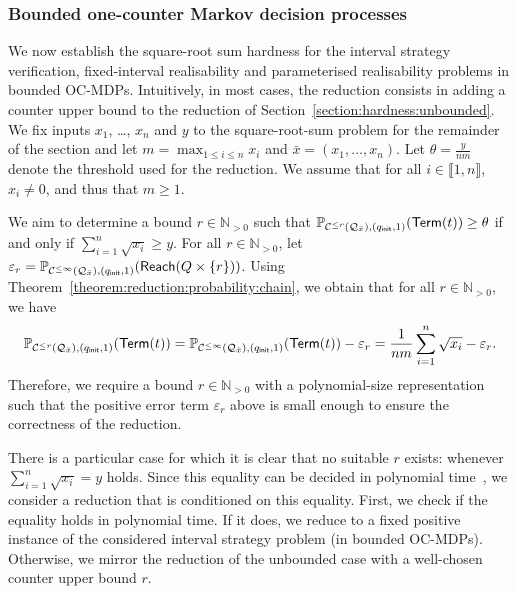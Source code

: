 \documentclass[a4paper,UKenglish,cleveref,autoref,thm-restate,colorlinks]{lipics-v2021}
\newcommand{\init}{\mathsf{init}}
\newcommand{\integerInterval}[1]{\llbracket{}#1\rrbracket{}}
\newcommand{\sqsx}{x} \newcommand{\sqsxVect}{\bar{x}} \newcommand{\sqsm}{m} \newcommand{\sqsy}{y} \newcommand{\sqsi}{i} \newcommand{\sqsn}{n} \newcommand{\sqsSize}{E}
\newcommand{\IN}{\mathbb{N}}
\newcommand{\INpos}{\IN_{>0}}
\newcommand{\ocmdp}{\mathcal{Q}}
\newcommand{\ocStateSpace}{Q}
\newcommand{\ocState}{q}
\newcommand{\ocStateC}{t}
\newcommand{\counterUB}{r}
\newcommand{\mchain}{\mathcal{C}}
\newcommand{\ocChainFin}[2]{\mchain^{\leq #2}(#1)}
\newcommand{\chainX}{\ocmdp_{\sqsxVect}}
\newcommand{\eleError}[1]{\varepsilon_{#1}}
\newcommand{\reach}[1]{\mathsf{Reach}(#1)}
\newcommand{\termination}{\mathsf{Term}}
\newcommand{\selectiveTermination}[1]{\termination({#1})}
\newcommand{\thresProba}{\theta}
\begin{document}
\subsubsection{Bounded one-counter Markov decision processes}\label{section:hardness:bounded}

We now establish the square-root sum hardness for the interval strategy verification, fixed-interval realisability and parameterised realisability problems  in bounded OC-MDPs.
Intuitively, in most cases, the reduction consists in adding a counter upper bound to the reduction of Section~\ref{section:hardness:unbounded}.
We fix inputs $\sqsx_1$, \ldots, $\sqsx_\sqsn$ and $\sqsy$ to the square-root-sum problem for the remainder of the section and let $\sqsm = \max_{1\leq\sqsi\leq\sqsn}\sqsx_\sqsi$ and $\sqsxVect = (\sqsx_1,\ldots, \sqsx_\sqsn)$.
Let $\thresProba = \frac{\sqsy}{\sqsn\sqsm}$ denote the threshold used for the reduction.
We assume that for all $\sqsi\in\integerInterval{1, \sqsn}$, $\sqsx_\sqsi\neq 0$, and thus that $\sqsm\geq1$.

We aim to determine a bound $\counterUB\in\INpos$ such that $\probaMCverb{\ocChainFin{\chainX}{\counterUB}}{(\ocState_\init, 1)}(\selectiveTermination{\ocStateC})\geq\thresProba$ if and only if $\sum_{\sqsi=1}^\sqsn\sqrt{\sqsx_\sqsi}\geq\sqsy$.
For all $\counterUB\in\INpos$, let $\eleError{\counterUB} = \probaMCverb{\ocChainFin{\chainX}{\infty}}{(\ocState_\init, 1)}(\reach{\ocStateSpace\times\{\counterUB\}})$.
Using Theorem~\ref{theorem:reduction:probability:chain}, we obtain that for all $\counterUB\in\INpos$, we have
\begin{equation*}
  \probaMCverb{\ocChainFin{\chainX}{\counterUB}}{(\ocState_\init, 1)}(\selectiveTermination{\ocStateC})
  = \probaMCverb{\ocChainFin{\chainX}{\infty}}{(\ocState_\init, 1)}(\selectiveTermination{\ocStateC})
  - \eleError{\counterUB}
  = \frac{1}{\sqsn\sqsm}\sum_{\sqsi=1}^\sqsn\sqrt{\sqsx_\sqsi}
  -\eleError{\counterUB}.
\end{equation*}
Therefore, we require a bound $\counterUB\in\INpos$ with a polynomial-size representation such that the positive error term $\eleError{\counterUB}$ above is small enough to ensure the correctness of the reduction.

There is a particular case for which it is clear that no suitable $\counterUB$ exists: whenever $\sum_{\sqsi=1}^\sqsn\sqrt{\sqsx_\sqsi} = \sqsy$ holds.
Since this equality can be decided in polynomial time~\cite{DBLP:journals/jsc/BorodinFHT85}, we consider a reduction that is conditioned on this equality.
First, we check if the equality holds in polynomial time.
If it does, we reduce to a fixed positive instance of the considered interval strategy problem (in bounded OC-MDPs).
Otherwise, we mirror the reduction of the unbounded case with a well-chosen counter upper bound $\counterUB$.
\end{document}
